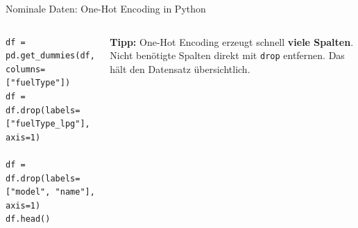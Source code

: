 \begin{frame}[fragile]{Nominale Daten: One-Hot Encoding in Python}
\begin{columns}
\begin{verbatim}
df = pd.get_dummies(df, columns=["fuelType"])
df = df.drop(labels=["fuelType_lpg"], axis=1)

df = df.drop(labels=["model", "name"], axis=1)
df.head()
\end{verbatim}

\footnotesize
\textbf{Tipp:} One-Hot Encoding erzeugt schnell \textbf{viele Spalten}.
Nicht benötigte Spalten direkt mit \texttt{drop} entfernen. Das hält
den Datensatz übersichtlich.
\end{columns}

\vspace{0.6em}
\centering
\footnotesize
\renewcommand{\arraystretch}{1.3}

\end{frame}

